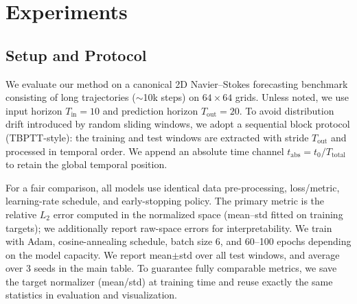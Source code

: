 \section*{Experiments}

\subsection*{Setup and Protocol}
We evaluate our method on a canonical 2D Navier–Stokes forecasting benchmark consisting of long trajectories ($\sim$10k steps) on $64\times64$ grids. Unless noted, we use input horizon $T_\text{in}=10$ and prediction horizon $T_\text{out}=20$. To avoid distribution drift introduced by random sliding windows, we adopt a sequential block protocol (TBPTT-style): the training and test windows are extracted with stride $T_\text{out}$ and processed in temporal order. We append an absolute time channel $t_\text{abs}\!=\!t_0/T_\text{total}$ to retain the global temporal position. 

For a fair comparison, all models use identical data pre-processing, loss/metric, learning-rate schedule, and early-stopping policy. The primary metric is the relative $L_2$ error computed in the normalized space (mean–std fitted on training targets); we additionally report raw-space errors for interpretability. We train with Adam, cosine-annealing schedule, batch size 6, and 60–100 epochs depending on the model capacity. We report mean$\pm$std over all test windows, and average over 3 seeds in the main table. To guarantee fully comparable metrics, we save the target normalizer (mean/std) at training time and reuse exactly the same statistics in evaluation and visualization. 

